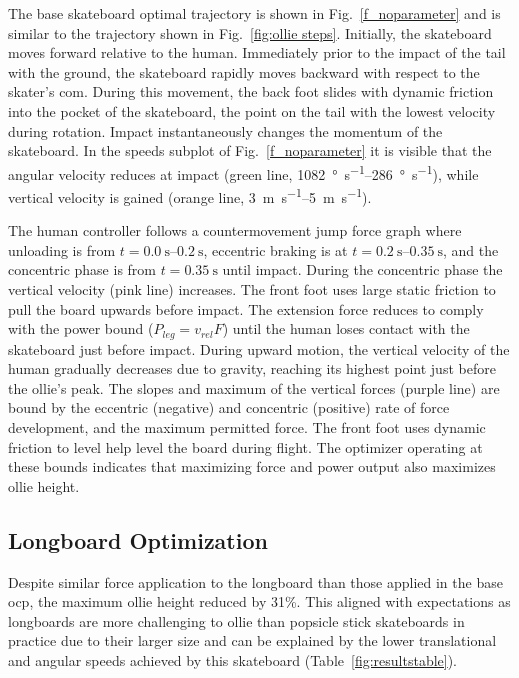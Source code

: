 \documentclass[default,iicol,pdflatex]{sn-jnl}
\begin{document}
The base skateboard optimal trajectory is shown in Fig.~\ref{f_noparameter} and is similar to the trajectory shown in Fig.~\ref{fig:ollie steps}.
Initially, the skateboard moves forward relative to the human. Immediately prior to the impact of the tail with the ground, the skateboard rapidly moves backward with respect to the skater's \gls{com}. During this movement, the back foot slides with dynamic friction into the pocket of the skateboard, the point on the tail with the lowest velocity during rotation. 
Impact instantaneously changes the momentum of the skateboard.
In the speeds subplot of Fig.~\ref{f_noparameter} it is visible that the angular velocity reduces at impact (green line, \SIrange{1082}{286}{\degree\per\second}), while vertical velocity is gained (orange line, \SIrange{3}{5}{\meter\per\second}).

The human controller follows a countermovement jump force graph where unloading is from $t=\SIrange{0.0}{0.2}{\second}$, eccentric braking is at $t=\SIrange{0.2}{0.35}{\second}$, and the concentric phase is from $t=\SI{0.35}{\second}$ until impact.
During the concentric phase the vertical velocity (pink line) increases. The front foot uses large static friction to pull the board upwards before impact.
The extension force reduces to comply with the power bound ($P_{leg} = v_{rel} F$) until the human loses contact with the skateboard just before impact.
During upward motion, the vertical velocity of the human gradually decreases due to gravity, reaching its highest point just before the ollie's peak.
The slopes and maximum of the vertical forces (purple line) are bound by the eccentric (negative) and concentric (positive) rate of force development, and the maximum permitted force. The front foot uses dynamic friction to level help level the board during flight.
The optimizer operating at these bounds indicates that maximizing force and power output also maximizes ollie height.

\subsection{Longboard Optimization}
%
Despite similar force application to the longboard than those applied in the base \gls{ocp}, the maximum ollie height reduced by 31\%. This aligned with expectations as longboards are more challenging to ollie than popsicle stick skateboards in practice due to their larger size and can be explained by the lower translational and angular speeds achieved by this skateboard (Table~\ref{fig:resultstable}).
\end{document}

